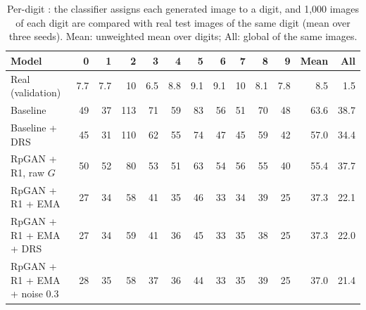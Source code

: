 \begin{table}[H]
\centering
\footnotesize
\setlength{\tabcolsep}{4pt}
\begin{tabular}{lrrrrrrrrrrrr}
\toprule
Model & 0 & 1 & 2 & 3 & 4 & 5 & 6 & 7 & 8 & 9 & Mean & All \\
\midrule
Real (validation) & 7.7 & 7.7 & 10 & 6.5 & 8.8 & 9.1 & 9.1 & 10 & 8.1 & 7.8 & 8.5 & 1.5 \\
Baseline & 49 & 37 & 113 & 71 & 59 & 83 & 56 & 51 & 70 & 48 & 63.6 & 38.7 \\
Baseline + DRS & 45 & 31 & 110 & 62 & 55 & 74 & 47 & 45 & 59 & 42 & 57.0 & 34.4 \\
RpGAN + R1, raw $G$ & 50 & 52 & 80 & 53 & 51 & 63 & 54 & 56 & 55 & 40 & 55.4 & 37.7 \\
RpGAN + R1 + EMA & 27 & 34 & 58 & 41 & 35 & 46 & 33 & 34 & 39 & 25 & 37.3 & 22.1 \\
RpGAN + R1 + EMA + DRS & 27 & 34 & 59 & 41 & 36 & 45 & 33 & 35 & 38 & 25 & 37.3 & 22.0 \\
RpGAN + R1 + EMA + noise 0.3 & 28 & 35 & 58 & 37 & 36 & 44 & 33 & 35 & 39 & 25 & 37.0 & 21.4 \\
\bottomrule
\end{tabular}
\caption{Per-digit \finc{}: the classifier assigns each generated image to a digit, and 1,000 images of each digit are compared with real test images of the same digit (mean over three seeds). Mean: unweighted mean over digits; All: global \finc{} of the same images.}
\label{tab:supp-perdigit}
\end{table}
